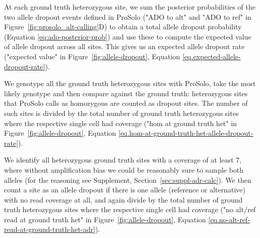 \documentclass[12pt,inline]{wlscirep}
\begin{document}
\begin{enumerate*}
 \item At each ground truth heterozygous site, we sum the posterior probabilities of the two allele dropout events defined in ProSolo ("ADO to alt" and "ADO to ref" in Figure~\ref{fig:prosolo_alt-calling}D) to obtain a total allele dropout probability (Equation \ref{eq:ado-posterior-prob}) and use these to compute the expected value of allele dropout across all sites.
 This gives us an expected allele dropout rate ("expected value" in Figure~\ref{fig:allele-dropout}, Equation \ref{eq.expected-allele-dropout-rate}).
 \item We genotype all the ground truth heterozygous sites with ProSolo, take the most likely genotype and then compare against the ground truth: heterozygous sites that ProSolo calls as homozygous are counted as dropout sites. The number of such sites is divided by the total number of ground truth heterozygous sites where the respective single cell had coverage ("hom at ground truth het" in Figure~\ref{fig:allele-dropout}, Equation \ref{eq.hom-at-ground-truth-het-allele-dropout-rate}).
 \item We identify all heterozygous ground truth sites with a coverage of at least 7, where without amplification bias we could be reasonably sure to sample both alleles (for the reasoning see Supplement, Section~\ref{sec:suppl-adr-calc}).
 We then count a site as an allele dropout if there is one allele (reference or alternative) with no read coverage at all, and again divide by the total number of ground truth heterozygous sites where the respective single cell had coverage ("no alt/ref read at ground truth het" in Figure~\ref{fig:allele-dropout}, Equation \ref{eq.no-alt-ref-read-at-ground-truth-het-adr}).
\end{enumerate*}
\end{document}
